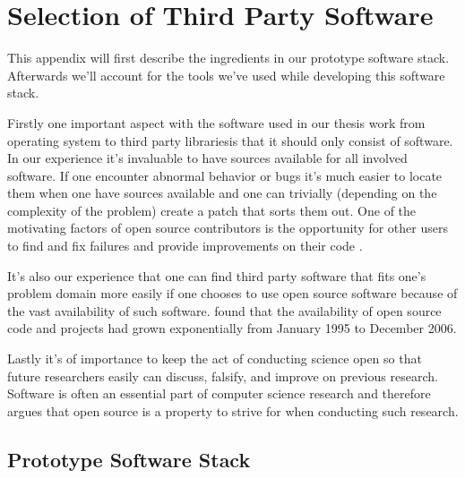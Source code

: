 \chapter{Selection of Third Party Software}
\label{appendix:selection.of.third.party.software}

This appendix will first describe the ingredients in our prototype software
stack. Afterwards we'll account for the tools we've used while developing
this software stack.

Firstly one important aspect with the software used in our thesis work
\dash{}from operating system to third party libraries\dash{}is
that it should only consist of 
software. In our experience it's
invaluable to have sources available for all involved software. If one
encounter abnormal behavior or bugs it's much easier to locate them when one
have sources available and one can trivially (depending on the complexity of
the problem) create a patch that sorts them out. One of the motivating factors
of open source contributors is the opportunity for other users to find and fix
failures and provide improvements on their code \citep[]{hippel05}.

It's also our experience that one can find third party software that fits
one's problem domain more easily if one chooses to use open source software
because of the vast availability of such software.
\citet{deshpande08} found that the availability of open source
code and projects had grown exponentially from January 1995 to December 2006.

Lastly it's of importance to keep the act of conducting science open so that
future researchers easily can discuss, falsify, and improve on previous
research. Software is often an essential part of computer science research and
\citet[]{kelty05} therefore argues that open source
is a property to strive for when conducting such research.

\section{Prototype Software Stack}

